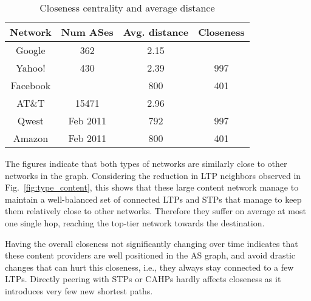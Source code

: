 \documentclass[conference]{IEEEtran}
\newcommand{\ignore}[1]{}
\newcommand{\figref}[1]{Fig.~\ref{#1}}
\newcommand{\figsize}{0.45}
\begin{document}
{{\begin{table}[h]
\small
\begin{center}
\begin{tabular}{|c|c|c|c|}
\hline
Network & Num ASes & Avg. distance & Closeness  \\
\hline
Google & 362 & 2.15 &    \\
Yahoo! & 430  & 2.39 & 997  \\
Facebook &  & 800 & 401  \\
\hline
AT\&T & 15471 & 2.96 &   \\
Qwest & Feb 2011 & 792 & 997  \\
Amazon & Feb 2011 & 800 & 401  \\
\hline
\end{tabular}
\caption{Closeness centrality and average distance}
\label{table:closeness}
\end{center}
\end{table}
}

The figures indicate that both types of networks are similarly close to other networks
in the graph. Considering the reduction in LTP neighbors observed in \figref{fig:type_content},
this shows that
these large content network manage to maintain a well-balanced set of connected LTPs and STPs
that manage to keep them relatively close to other networks.
Therefore they suffer on average at most one single hop, reaching the top-tier
network towards the destination.

Having the overall closeness not significantly changing over time indicates that
these content providers are well positioned in the AS graph, and avoid drastic changes that
can hurt this closeness, i.e., they always stay connected to a few LTPs. Directly peering
with STPs or CAHPs hardly affects closeness as it introduces very few new shortest paths.

}

\ignore{
\subsection{Eigenvalues}
Eigenvector centrality is a measure of the importance of a node in a network. It assigns relative scores to all nodes in the network based on the principle that connections to high-scoring nodes contribute more to the score of the node in question than equal connections to low-scoring nodes.

\begin{figure}[tbh]
\centering
    \subfloat[Content]{
	\label{fig:ev_content}
    \epsfig{file=fig/content_iplane_ev,width=\figsize\textwidth}
    }
    \hspace{-1mm}
    \subfloat[Transit]{
    \label{fig:ev_transit}
    \epsfig{file=fig/transit_iplane_ev,width=\figsize\textwidth}
    }
    \caption{Eigenvalue centrality}
    \label{fig:ev_centrality}
\end{figure}
}
\end{document}
